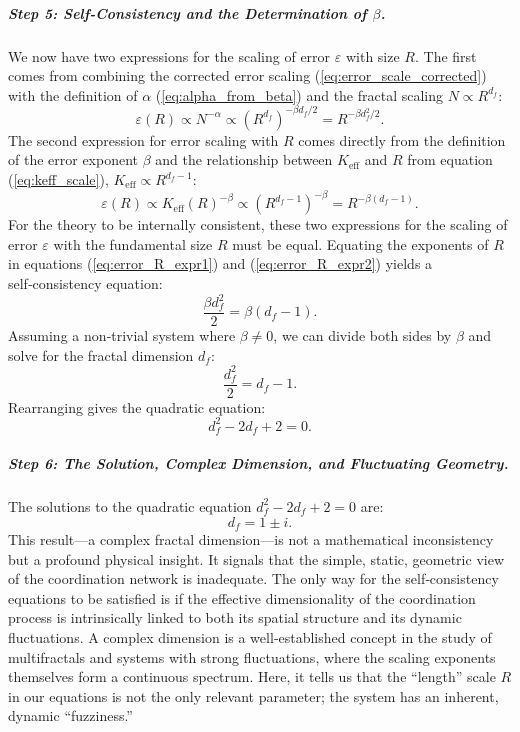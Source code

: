 \documentclass[12pt,a4paper]{article}
\theoremstyle{remark}
\newcommand{\Ke}{K_{\mathrm{eff}}}
\begin{document}
\subparagraph*{Step 5: Self‑Consistency and the Determination of \(\beta\).}
We now have two expressions for the scaling of error \(\varepsilon\) with size \(R\). The first comes from combining the corrected error scaling (\ref{eq:error_scale_corrected}) with the definition of \(\alpha\) (\ref{eq:alpha_from_beta}) and the fractal scaling \(N \propto R^{d_f}\):
\begin{equation}
	\varepsilon(R) \propto N^{-\alpha} \propto (R^{d_f})^{-\beta d_f/2} = R^{-\beta d_f^2 / 2}.
	\label{eq:error_R_expr1}
\end{equation}
The second expression for error scaling with \(R\) comes directly from the definition of the error exponent \(\beta\) and the relationship between \(\Ke\) and \(R\) from equation (\ref{eq:keff_scale}), \(\Ke \propto R^{d_f-1}\):
\begin{equation}
	\varepsilon(R) \propto \Ke(R)^{-\beta} \propto (R^{d_f-1})^{-\beta} = R^{-\beta(d_f-1)}.
	\label{eq:error_R_expr2}
\end{equation}
For the theory to be internally consistent, these two expressions for the scaling of error \(\varepsilon\) with the fundamental size \(R\) must be equal. Equating the exponents of \(R\) in equations (\ref{eq:error_R_expr1}) and (\ref{eq:error_R_expr2}) yields a self‑consistency equation:
\begin{equation}
	\frac{\beta d_f^2}{2} = \beta (d_f - 1).
	\label{eq:consistency}
\end{equation}
Assuming a non‑trivial system where \(\beta \neq 0\), we can divide both sides by \(\beta\) and solve for the fractal dimension \(d_f\):
\begin{equation}
	\frac{d_f^2}{2} = d_f - 1.
\end{equation}
Rearranging gives the quadratic equation:
\begin{equation}
	d_f^2 - 2d_f + 2 = 0.
	\label{eq:quadratic}
\end{equation}

\subparagraph*{Step 6: The Solution, Complex Dimension, and Fluctuating Geometry.}
The solutions to the quadratic equation \(d_f^2 - 2d_f + 2 = 0\) are:
\begin{equation}
	d_f = 1 \pm i.
	\label{eq:df_solution}
\end{equation}
This result—a complex fractal dimension—is not a mathematical inconsistency but a profound physical insight. It signals that the simple, static, geometric view of the coordination network is inadequate. The only way for the self‑consistency equations to be satisfied is if the effective dimensionality of the coordination process is intrinsically linked to both its spatial structure and its dynamic fluctuations. A complex dimension is a well‑established concept in the study of multifractals and systems with strong fluctuations, where the scaling exponents themselves form a continuous spectrum. Here, it tells us that the “length” scale \(R\) in our equations is not the only relevant parameter; the system has an inherent, dynamic “fuzziness.”
\end{document}
